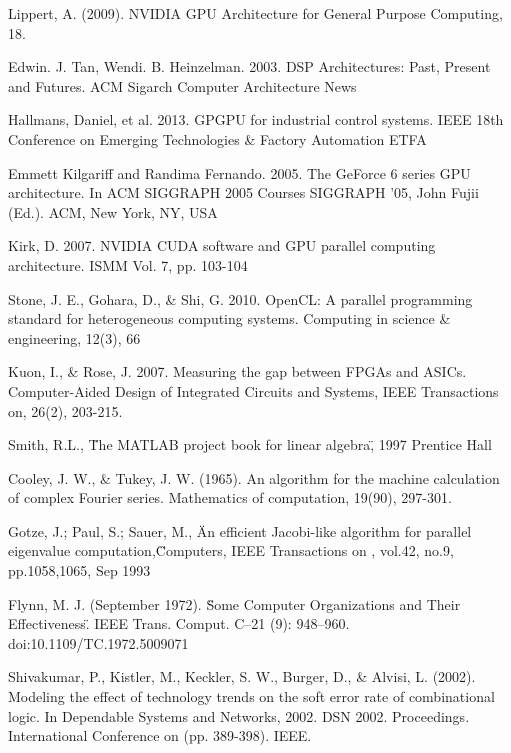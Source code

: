 \newpage
\pagestyle{plain}


\begin{thebibliography}{99}

 Lippert, A. (2009). NVIDIA GPU Architecture for General Purpose Computing, 18.

 Edwin. J. Tan, Wendi. B. Heinzelman. 2003. DSP Architectures: Past, Present and Futures. ACM Sigarch Computer Architecture News

 Hallmans, Daniel, et al. 2013. GPGPU for industrial control systems. IEEE 18th Conference on Emerging Technologies \& Factory Automation ETFA

 Emmett Kilgariff and Randima Fernando. 2005. The GeForce 6 series GPU architecture. In ACM SIGGRAPH 2005 Courses SIGGRAPH '05, John Fujii (Ed.). ACM, New York, NY, USA

 Kirk, D. 2007. NVIDIA CUDA software and GPU parallel computing architecture. ISMM Vol. 7, pp. 103-104

 Stone, J. E., Gohara, D., \& Shi, G. 2010. OpenCL: A parallel programming standard for heterogeneous computing systems. Computing in science \& engineering, 12(3), 66

 Kuon, I., \& Rose, J. 2007. Measuring the gap between FPGAs and ASICs. Computer-Aided Design of Integrated Circuits and Systems, IEEE Transactions on, 26(2), 203-215.

Smith, R.L., \"The MATLAB project book for linear algebra\", 1997 Prentice Hall

 Cooley, J. W., \& Tukey, J. W. (1965). An algorithm for the machine calculation of complex Fourier series. Mathematics of computation, 19(90), 297-301.

 Gotze, J.; Paul, S.; Sauer, M., \"An efficient Jacobi-like algorithm for parallel eigenvalue computation,\" Computers, IEEE Transactions on , vol.42, no.9, pp.1058,1065, Sep 1993

Flynn, M. J. (September 1972). \"Some Computer Organizations and Their Effectiveness\". IEEE Trans. Comput. C–21 (9): 948–960. doi:10.1109/TC.1972.5009071

 Shivakumar, P., Kistler, M., Keckler, S. W., Burger, D., \& Alvisi, L. (2002). Modeling the effect of technology trends on the soft error rate of combinational logic. In Dependable Systems and Networks, 2002. DSN 2002. Proceedings. International Conference on (pp. 389-398). IEEE.


\end{thebibliography}
